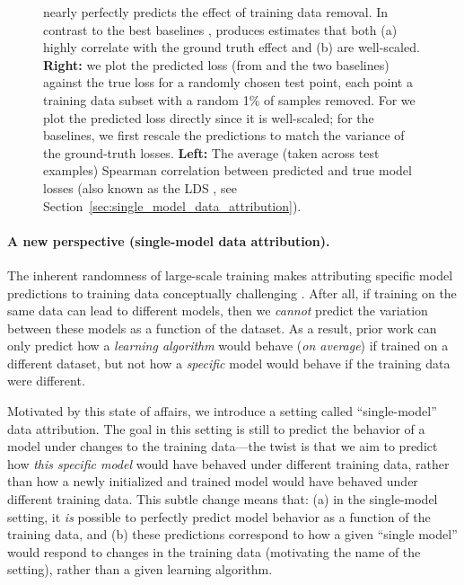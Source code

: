 \begin{figure}[ht]
  \centering
  \newcommand{\dataset}{cifar}
  \newcommand{\exampleid}{0}
  \newcommand{\scatteropacity}{0.5}
  \newcommand{\setting}{ResNet-9 on CIFAR-10}
  \newcommand{\fracone}{1}
  \newcommand{\frachtwo}{5}
  \newcommand{\datacsvscatterone}{plots/scatter/scatter_results_cifar/ind_0_dropfrac_0.01.csv}
  \newcommand{\datacsvscattertwo}{plots/scatter/scatter_results_cifar/ind_0_dropfrac_0.05.csv}
  
  \caption{ \method{} nearly perfectly predicts the effect of training data
    removal. In contrast to the best baselines \citep{park2023trak,grosse2023studying}, 
    \method{} produces estimates
    that both (a) highly correlate with the ground truth effect and (b) are
    well-scaled. {\bf Right:} we plot the predicted loss (from \method{} and 
    the two baselines) against the true loss for a
    randomly chosen test point, each point a training data subset with a random
    1\% of samples removed. For \method{} we plot the predicted loss directly 
    since it is well-scaled; for the baselines, we first rescale the predictions 
    to match the variance of the ground-truth losses.
    {\bf Left:} The average (taken across test examples) 
    Spearman correlation between predicted and true model losses (also known as 
    the LDS \citep{ilyas2022datamodels,park2023trak}, see Section~\ref{sec:single_model_data_attribution}).}
  \label{fig:headline}
\end{figure}

\paragraph{A new perspective (single-model data
attribution).} The inherent randomness of large-scale training makes
attributing specific model predictions to training data
conceptually
challenging \citep{bae2022if,ilyas2022datamodels,nguyen2023bayesian}. After all,
if training on the same data can lead to different models, then
we {\em cannot} predict the variation between these models as a
function of the dataset.
As a result, prior work can only predict how a {\em learning algorithm}
would behave ({\em on average}) if trained on a different dataset,
but not how a {\em specific} model would behave if the training data were
different.

Motivated by this state of affairs,
we introduce a setting called ``single-model'' data attribution.
The goal in this setting is still to predict the behavior of a model under
changes to the training data---the twist is that
we aim to predict how {\em this specific model} would have behaved
under different training data, rather than how a newly initialized
and trained model would have behaved
under different training data.
This subtle change means that: (a) in the single-model setting,
it {\em is} possible to perfectly predict model behavior as a function
of the training data, and (b)
these predictions correspond to how a given ``single model''
would respond to changes in the training data (motivating the name
of the setting), rather than a given learning algorithm.




